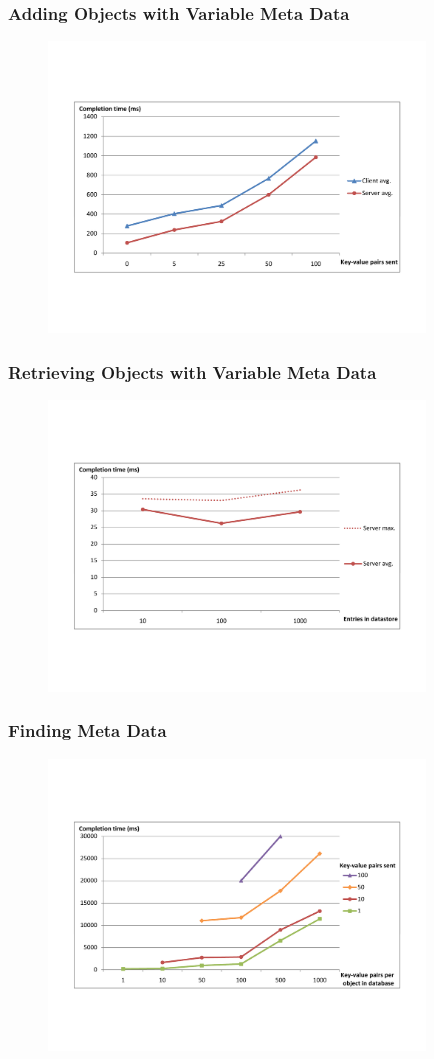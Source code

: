 \documentclass{beamer}
\begin{document}
\frame
{
	\frametitle{Adding Objects with Variable Meta Data}
	\begin{figure}[t]
	\begin{center}
	\includegraphics[trim=4cm 4cm 4cm 5cm, width=10cm]{add_md.pdf} 
	\end{center}
	\end{figure}
}

\frame
{
	\frametitle{Retrieving Objects with Variable Meta Data}
	\begin{figure}[t]
	\begin{center}
	\includegraphics[trim=4cm 4cm 4cm 5cm, width=10cm]{get_amt.pdf} 
	\end{center}
	\end{figure}
}

\frame
{
	\frametitle{Finding Meta Data}
	\begin{figure}[t]
	\begin{center}
	\includegraphics[trim=4cm 4cm 4cm 5cm, width=10cm]{find_amt.pdf} 
	\end{center}
	\end{figure}
}
\end{document}

